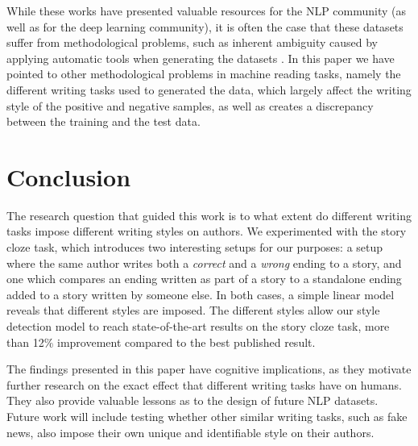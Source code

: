 \documentclass[11pt,a4paper]{article}
\newcommand{\isectionb}[1]{\section{#1}\label{ssec:#1}}
\begin{document}
While these works have presented valuable resources for the NLP community (as well as for the deep learning community), 
it is often the case that these datasets suffer from methodological problems, such as inherent ambiguity caused by applying automatic tools when generating the datasets \cite{Chen:2016}. 
In this paper we have pointed to other methodological problems in  machine reading tasks, namely the different writing tasks used to generated the data, which largely affect the writing style of the positive and negative samples, as well as creates a discrepancy between the training and the test data.


\isectionb{Conclusion}

The research question that guided this work is to what extent do different writing tasks impose different writing styles on authors.
We experimented with the story cloze task, which introduces two interesting setups for our purposes:
a setup where the same author writes both a {\it correct} and a {\it wrong} ending to a story, 
and one which compares an ending written as part of a story to a standalone ending added to a story written by someone else.
In both cases, a simple linear model reveals that different styles are imposed.
The different styles allow our style detection model to reach state-of-the-art results on the story cloze task, more than 12\% improvement compared to the best published result.

The findings presented in this paper have  cognitive implications, as they motivate further research on the exact effect that different writing tasks have on humans.
They also provide valuable lessons as to the design of future NLP datasets.
Future work will include testing whether other similar writing tasks, such as fake news, also impose their own unique and identifiable style on their authors.




%
%

\newpage


\end{document}
